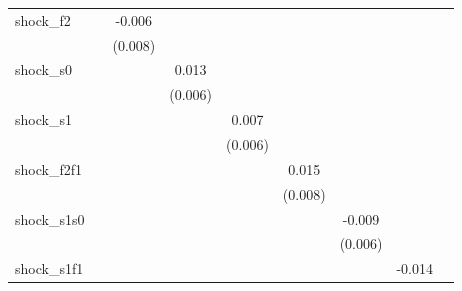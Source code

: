 {\begin{tabular}{l*{8}{c}}
\addlinespace
shock\_f2    &                     &      -0.006         &                     &                     &                     &                     &                     &                     \\
            &                     &     (0.008)         &                     &                     &                     &                     &                     &                     \\
\addlinespace
shock\_s0    &                     &                     &       0.013\sym{**} &                     &                     &                     &                     &                     \\
            &                     &                     &     (0.006)         &                     &                     &                     &                     &                     \\
\addlinespace
shock\_s1    &                     &                     &                     &       0.007         &                     &                     &                     &                     \\
            &                     &                     &                     &     (0.006)         &                     &                     &                     &                     \\
\addlinespace
shock\_f2f1  &                     &                     &                     &                     &       0.015\sym{*}  &                     &                     &                     \\
            &                     &                     &                     &                     &     (0.008)         &                     &                     &                     \\
\addlinespace
shock\_s1s0  &                     &                     &                     &                     &                     &      -0.009         &                     &                     \\
            &                     &                     &                     &                     &                     &     (0.006)         &                     &                     \\
\addlinespace
shock\_s1f1  &                     &                     &                     &                     &                     &                     &      -0.014         &                     \\

\end{tabular}}
